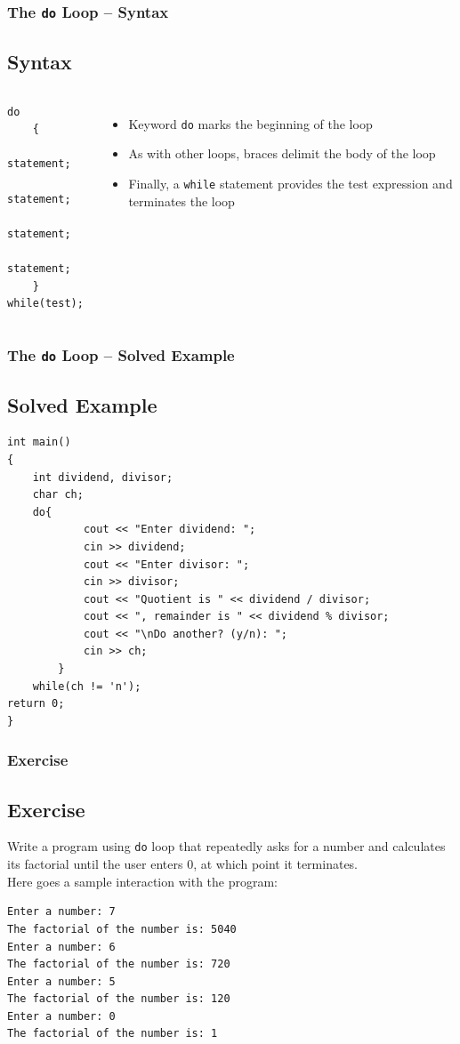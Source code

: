 \documentclass{beamer}
\begin{document}
\begin{frame}[fragile]
    \frametitle{The \texttt{do} Loop -- Syntax}
    \subsection{Syntax} %
    \begin{columns}
        \lstset{style=mystyle}
\begin{lstlisting}
do
    {
       statement;
       statement;
       statement;
       statement;
    }
while(test);
\end{lstlisting}
            \begin{itemize}
            \item Keyword \texttt{do} marks the beginning of the loop
            \item As with other loops, braces delimit the body of the loop
            \item Finally, a \texttt{while} statement provides the test expression and terminates the loop
            \end{itemize}
    \end{columns}
\end{frame}

\begin{frame} [fragile]
    \frametitle{The \texttt{do} Loop -- Solved Example}
    \subsection{Solved Example} %
    \lstset{style=mystyle}
    \begin{lstlisting}
int main()
{
    int dividend, divisor;
    char ch;
    do{
            cout << "Enter dividend: ";
            cin >> dividend;
            cout << "Enter divisor: ";
            cin >> divisor;
            cout << "Quotient is " << dividend / divisor;
            cout << ", remainder is " << dividend % divisor;
            cout << "\nDo another? (y/n): ";
            cin >> ch;
        }
    while(ch != 'n');
return 0;
}
\end{lstlisting}
\end{frame}

\begin{frame} [fragile]
    \frametitle{Exercise}
    \subsection{Exercise} %
    \label{subsec:do_exercise}
    Write a program using \texttt{do} loop that repeatedly asks for a number and calculates its factorial until the user enters 0, at which point it terminates. \\ [0.2 in]
    Here goes a sample interaction with the program: \\
    \lstset{style=mystyle}
\begin{lstlisting}
Enter a number: 7
The factorial of the number is: 5040
Enter a number: 6
The factorial of the number is: 720
Enter a number: 5
The factorial of the number is: 120
Enter a number: 0
The factorial of the number is: 1
\end{lstlisting}
\end{frame}
\end{document}
